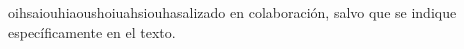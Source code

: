 
\begin{declaration}

oihsaiouhiaoushoiuahsiouhasalizado en colaboración, salvo que se indique específicamente en el texto. 
\end{declaration}
